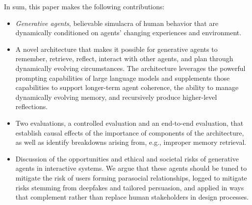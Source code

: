 In sum, this paper makes the following contributions:
\begin{itemize}
    \item \textit{Generative agents}, believable simulacra of human behavior that are dynamically conditioned on agents' changing experiences and environment.
    \item A novel architecture that makes it possible for generative agents to remember, retrieve, reflect, interact with other agents, and plan through dynamically evolving circumstances. The architecture leverages the powerful prompting capabilities of large language models and supplements those capabilities to support longer-term agent coherence, the ability to manage dynamically evolving memory, and recursively produce higher-level reflections.
    \item Two evaluations, a controlled evaluation and an end-to-end evaluation, that establish causal effects of the importance of components of the architecture, as well as identify breakdowns arising from, e.g., improper memory retrieval. 
    \item Discussion of the opportunities and ethical and societal risks of generative agents in interactive systems. We argue that these agents should be tuned to mitigate the risk of users forming parasocial relationships, logged to mitigate risks stemming from deepfakes and tailored persuasion, and applied in ways that complement rather than replace human stakeholders in design processes.
\end{itemize}





